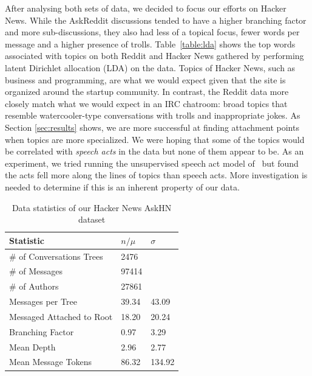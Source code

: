 \documentclass{article}
\begin{document}
After analysing both sets of data, we decided to focus our efforts on Hacker
News. While the AskReddit discussions tended to have a higher branching factor
and more sub-discussions, they also had less of a topical focus, fewer words
per message and a higher presence of trolls. Table~\ref{table:lda} shows the
top words associated with topics on both Reddit and Hacker News gathered by
performing latent Dirichlet allocation (LDA) on the data. Topics of Hacker
News, such as business and programming, are what we would expect given that
the site is organized around the startup community. In contrast, the Reddit
data more closely match what we would expect in an IRC chatroom: broad topics
that resemble watercooler-type conversations with trolls and inappropriate
jokes. As Section \ref{sec:results} shows, we are more successful at finding
attachment points when topics are more specialized. We were hoping that some
of the topics would be correlated with \textit{speech acts} in the data but
none of them appear to be. As an experiment, we tried running the unsupervised
speech act model of~\cite{Paula} but found the acts fell more along the lines
of topics than speech acts. More investigation is needed to determine if this
is an inherent property of our data.


\begin{table}[ht]\footnotesize
 \centering
 \begin{tabular}{| l | l | l |} 
   \hline
   \textbf{Statistic} & \textbf{$n / \mu$} & \textbf{$\sigma$} \\
   \hline
   \# of Conversations Trees & 2476 & \\
   \# of Messages & 97414 & \\
   \# of Authors & 27861 & \\
   Messages per Tree & 39.34 & 43.09 \\
   Messaged Attached to Root &  18.20 & 20.24 \\
   Branching Factor & 0.97 & 3.29 \\
   Mean Depth & 2.96 & 2.77 \\
   Mean Message Tokens & 86.32 & 134.92 \\
   \hline
  \end{tabular}
  \caption{Data statistics of our Hacker News AskHN dataset}
  \label{table:stats}
\end{table}
\end{document}
